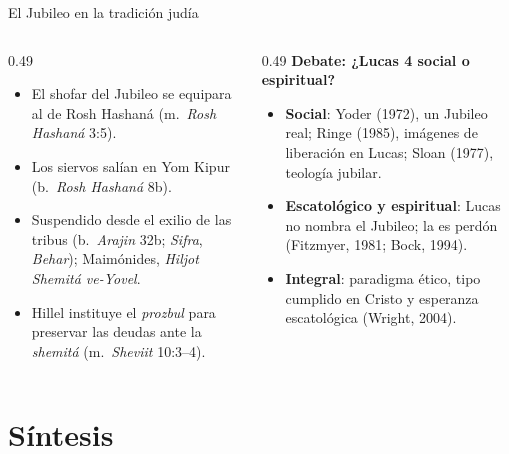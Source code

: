 \begin{frame}{El Jubileo en la tradición judía}
\begin{columns}[t,onlytextwidth]
\begin{column}{0.49\textwidth}\scriptsize
\begin{itemize}
\item El shofar del Jubileo se equipara al de Rosh Hashaná (m.~\emph{Rosh Hashaná} 3:5).
\item Los siervos salían en Yom Kipur (b.~\emph{Rosh Hashaná} 8b).
\item Suspendido desde el exilio de las tribus (b.~\emph{Arajin} 32b; \emph{Sifra}, \emph{Behar}); Maimónides, \emph{Hiljot Shemitá ve-Yovel}.
\item Hillel instituye el \emph{prozbul} para preservar las deudas ante la \emph{shemitá} (m.~\emph{Sheviit} 10:3--4).
\end{itemize}
\par\justifying{}
\end{column}
\begin{column}{0.49\textwidth}\scriptsize
\textbf{\textcolor{tierraroja}{Debate: ¿Lucas 4 social o espiritual?}}
\begin{itemize}
\item \textbf{Social}: Yoder (1972), un Jubileo real; Ringe (1985), imágenes de liberación en Lucas; Sloan (1977), teología jubilar.
\item \textbf{Escatológico y espiritual}: Lucas no nombra el Jubileo; la  es perdón (Fitzmyer, 1981; Bock, 1994).
\item \textbf{Integral}: paradigma ético, tipo cumplido en Cristo y esperanza escatológica (Wright, 2004).
\end{itemize}
\end{column}
\end{columns}
\end{frame}

\section{Síntesis}

